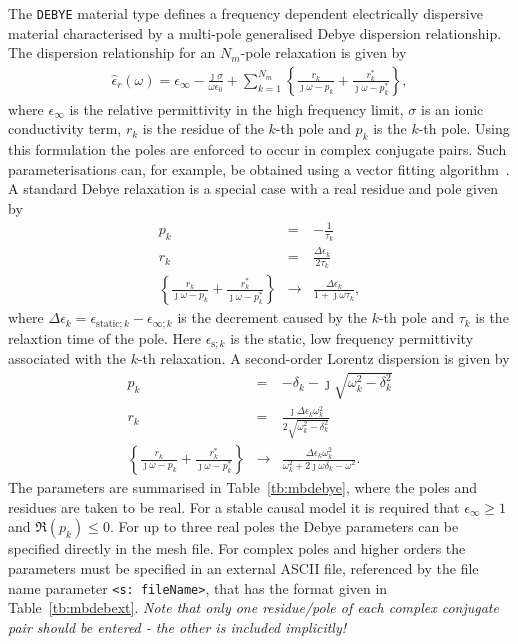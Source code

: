 \documentclass[onecolumn,a4paper]{article}
\numberwithin{equation}{section}
\begin{document}
The \texttt{DEBYE} material type defines a frequency dependent electrically dispersive material
characterised by a multi-pole generalised Debye dispersion relationship. The dispersion relationship 
for an $N_m$-pole relaxation is given by
\begin{eqnarray}
\hat{\epsilon}_r(\omega) = \epsilon_\infty - \frac{\jmath \sigma}{\omega \epsilon_0}
+\sum_{k=1}^{N_m} \left\{ \frac{r_k}{\jmath\omega - p_k} + \frac{r^*_k}{\jmath\omega - p^*_k} \right\},
\end{eqnarray}
where $\epsilon_{\infty}$ is the relative permittivity in the high frequency limit, 
$\sigma$ is an ionic conductivity term, $r_k$ is the residue of the $k$-th pole and $p_k$ is the 
$k$-th pole. Using this formulation the poles are enforced to occur in complex conjugate pairs.
Such parameterisations can, for example, be obtained using a vector fitting algorithm~\cite{Gustavsen1999}.
A standard Debye relaxation is a special case with a real residue and pole given by
\begin{eqnarray}
p_k &=& -\frac{1}{\tau_k} \\
r_k &=& \frac{\Delta \epsilon_k}{2 \tau_k} \\
 \left\{ \frac{r_k}{\jmath\omega - p_k} + \frac{r^*_k}{\jmath\omega - p^*_k} \right\}
&\rightarrow&
\frac{\Delta \epsilon_k}{1+\jmath\omega\tau_k}, 
\end{eqnarray}
where $\Delta \epsilon_k=\epsilon_{\mathrm{static};k}-\epsilon_{\infty;k}$ is the decrement caused by the $k$-th 
pole and $\tau_k$ is the relaxtion time of the pole. Here $\epsilon_{\mathrm{s};k}$ is the static, low frequency permittivity associated 
with the $k$-th relaxation.
A second-order Lorentz dispersion is given by
\begin{eqnarray}
p_k &=& -\delta_k -\jmath \sqrt{ \omega^2_k - \delta^2_k } \\
r_k &=& \frac{\jmath \Delta \epsilon_k \omega^2_k}{2 \sqrt{ \omega^2_k - \delta^2_k }} \\
 \left\{ \frac{r_k}{\jmath\omega - p_k} + \frac{r^*_k}{\jmath\omega - p^*_k} \right\}
&\rightarrow&
\frac{\Delta \epsilon_k \omega^2_k}{\omega^2_k+2\jmath\omega\delta_k-\omega^2}.
\end{eqnarray}
The parameters are summarised in Table~\ref{tb:mbdebye}, where the poles and residues are taken to be real. 
For a stable causal model it is required that $\epsilon_{\infty} \ge 1$ and $\Re(p_k) \le 0$.
For up to three real poles the Debye parameters can be specified directly in the mesh file. For complex
poles and higher orders the parameters must be specified in an external ASCII file, referenced by the file 
name parameter \texttt{<s:~fileName>}, that has the format given in Table~\ref{tb:mbdebext}. {\em Note that
only one residue/pole of each complex conjugate pair should be entered - the other is included implicitly!}
\end{document}
